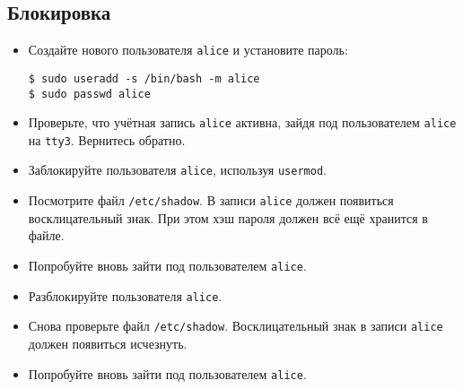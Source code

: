 \documentclass{article}
\begin{document}
\subsection{Блокировка}
\begin{itemize}
\item Создайте нового пользователя \texttt{alice} и установите пароль:
\begin{lstlisting}
$ sudo useradd -s /bin/bash -m alice
$ sudo passwd alice
\end{lstlisting}
\item Проверьте, что учётная запись \texttt{alice} активна, зайдя под пользователем \texttt{alice} на \texttt{tty3}. Вернитесь обратно.
\item Заблокируйте пользователя \texttt{alice}, используя \texttt{usermod}.
\item Посмотрите файл \texttt{/etc/shadow}. В записи \texttt{alice} должен появиться восклицательный знак. При этом хэш пароля должен всё ещё хранится в файле.
\item Попробуйте вновь зайти под пользователем \texttt{alice}.
\item Разблокируйте пользователя \texttt{alice}.
\item Снова проверьте файл \texttt{/etc/shadow}. Восклицательный знак в записи \texttt{alice} должен появиться исчезнуть.
\item Попробуйте вновь зайти под пользователем \texttt{alice}.
\end{itemize}
\end{document}
